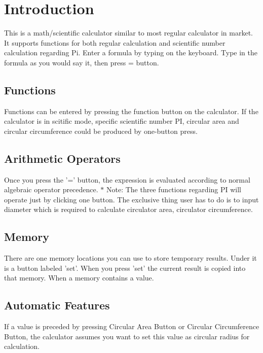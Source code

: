 \chapter{Introduction}
\noindent
This is a math/scientific calculator similar to most regular calculator in market. It supports functions for both regular calculation and scientific number calculation regarding Pi. Enter a formula by typing on the keyboard. Type in the formula as you would say it, then press = button.

\section{Functions}
\noindent
Functions can be entered by pressing the function button on the calculator. If the calculator is in scitific mode, specific scientific number PI, circular area and circular circumference could be produced by one-button press.

\section{Arithmetic Operators}
\noindent
Once you press the '=' button, the expression is evaluated according to normal algebraic operator precedence. 
$*$ Note: The three functions regarding PI will operate just by clicking one button. The exclusive thing user has to do is to input diameter which is required to calculate circulator area, circulator circumference.

\section{Memory}
\noindent
There are one memory locations you can use to store temporary results. Under it is a button labeled 'set'. When you press 'set' the current result is copied into that memory. When a memory contains a value.

\section{Automatic Features}
\noindent
If a value is preceded by pressing Circular Area Button or Circular Circumference Button, the calculator assumes you want to set this value as circular radius for calculation.
